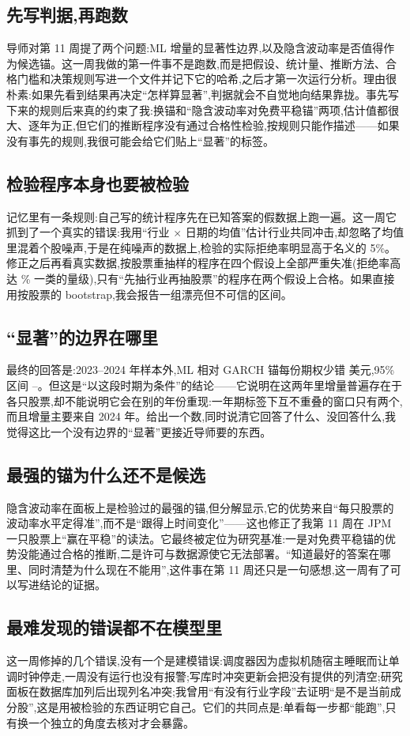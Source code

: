 \documentclass[11pt]{ctexart}
\begin{document}
\subsection{先写判据,再跑数}
导师对第 11 周提了两个问题:ML 增量的显著性边界,以及隐含波动率是否值得作为候选锚。这一周我做的第一件事不是跑数,而是把假设、统计量、推断方法、合格门槛和决策规则写进一个文件并记下它的哈希,之后才第一次运行分析。理由很朴素:如果先看到结果再决定“怎样算显著”,判据就会不自觉地向结果靠拢。事先写下来的规则后来真的约束了我:换锚和“隐含波动率对免费平稳锚”两项,估计值都很大、逐年为正,但它们的推断程序没有通过合格性检验,按规则只能作描述——如果没有事先的规则,我很可能会给它们贴上“显著”的标签。

\subsection{检验程序本身也要被检验}
记忆里有一条规则:自己写的统计程序先在已知答案的假数据上跑一遍。这一周它抓到了一个真实的错误:我用“行业 $\times$ 日期的均值”估计行业共同冲击,却忽略了均值里混着个股噪声,于是在纯噪声的数据上,检验的实际拒绝率明显高于名义的 5\%。修正之后再看真实数据,按股票重抽样的程序在四个假设上全部严重失准(拒绝率高达 \rnHTwoSizeTicker\% 一类的量级),只有“先抽行业再抽股票”的程序在两个假设上合格。如果直接用按股票的 bootstrap,我会报告一组漂亮但不可信的区间。

\subsection{“显著”的边界在哪里}
最终的回答是:2023--2024 年样本外,ML 相对 GARCH 锚每份期权少错 \rnHTwoDelta{} 美元,95\% 区间 \rnHTwoLo--\rnHTwoHi。但这是“以这段时期为条件”的结论——它说明在这两年里增量普遍存在于各只股票,却不能说明它会在别的年份重现:一年期标签下互不重叠的窗口只有两个,而且增量主要来自 2024 年。给出一个数,同时说清它回答了什么、没回答什么,我觉得这比一个没有边界的“显著”更接近导师要的东西。

\subsection{最强的锚为什么还不是候选}
隐含波动率在面板上是检验过的最强的锚,但分解显示,它的优势来自“每只股票的波动率水平定得准”,而不是“跟得上时间变化”——这也修正了我第 11 周在 JPM 一只股票上“赢在平稳”的读法。它最终被定位为研究基准:一是对免费平稳锚的优势没能通过合格的推断,二是许可与数据源使它无法部署。“知道最好的答案在哪里、同时清楚为什么现在不能用”,这件事在第 11 周还只是一句感想,这一周有了可以写进结论的证据。

\subsection{最难发现的错误都不在模型里}
这一周修掉的几个错误,没有一个是建模错误:调度器因为虚拟机随宿主睡眠而让单调时钟停走,一周没有运行也没有报警;写库时冲突更新会把没有提供的列清空;研究面板在数据库加列后出现列名冲突;我曾用“有没有行业字段”去证明“是不是当前成分股”,这是用被检验的东西证明它自己。它们的共同点是:单看每一步都“能跑”,只有换一个独立的角度去核对才会暴露。
\end{document}
